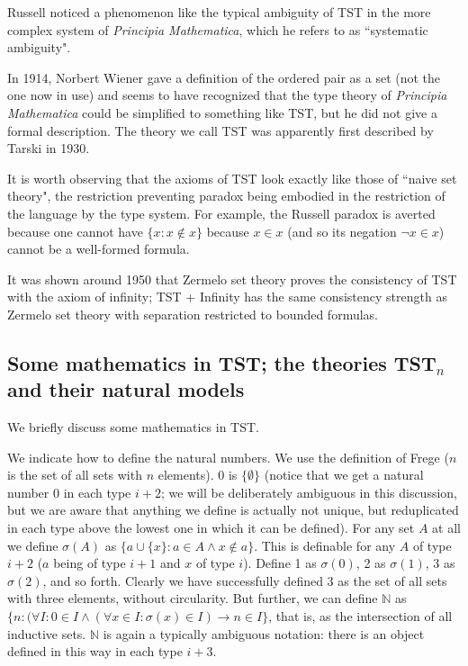 \documentclass[12pt]{article}
\begin{document}
Russell noticed a phenomenon like the typical ambiguity of TST in the more complex system of {\em Principia Mathematica\/}, which he refers to as ``systematic ambiguity".

In 1914, Norbert Wiener gave a definition of the ordered pair as a set (not the one now in use) and seems to have recognized that the type theory of {\em Principia Mathematica\/} could be simplified to something like TST, but he did not give a formal description.  The theory we call TST was apparently first described by Tarski in 1930.

It is worth observing that the axioms of TST look exactly like those of ``naive set theory", the restriction preventing paradox being embodied in the restriction of the language by the type system.
For example, the Russell paradox is averted because one cannot have $\{x:x \not\in x\}$ because $x \in x$ (and so its negation $\neg x \in x$) cannot be a well-formed formula.

It was shown around 1950 that Zermelo set theory proves the consistency of TST with the axiom of infinity;  TST + Infinity has the same consistency strength as
Zermelo set theory with separation restricted to bounded formulas.


\newpage

\subsection{Some mathematics in TST;  the theories TST$_n$ and their natural models}

We briefly discuss some mathematics in TST.

We indicate how to define the natural numbers.  We use the definition of Frege ($n$ is the set of all sets with $n$ elements).  0 is $\{\emptyset\}$ (notice that we get a natural number 0 in each type $i+2$;  we will be deliberately ambiguous in this discussion, but we are aware that anything we define is actually not unique, but reduplicated in each type above the lowest one in which it can be defined).  For any set $A$ at all we define $\sigma(A)$ as $\{a \cup \{x\}:a \in A \wedge x \not\in a\}$.  This is definable for any $A$ of type $i+2$ ($a$ being of type $i+1$ and $x$ of type $i$).  Define 1 as $\sigma(0)$, 2 as $\sigma(1)$,  3 as $\sigma(2)$, and so forth.  Clearly we have successfully defined 3 as the set of all sets with three elements, without circularity.
But further, we can define $\mathbb N$ as $\{n:(\forall I:0 \in I \wedge (\forall x \in I:\sigma(x) \in I) \rightarrow n \in I\}$, that is, as the intersection of all inductive sets.
$\mathbb N$ is again a typically ambiguous notation:  there is an object defined in this way in each type $i+3$.
\end{document}
